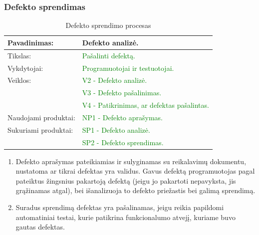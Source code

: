 \documentclass{VUMIFPSkursinis}
\begin{document}
	\subsubsection{Defekto sprendimas}
	\begin{center}
		\begin{table}[ht]
			\caption{Defekto sprendimo procesas}
			\begin{tabular}{ | l | l | }
				\hline
				Pavadinimas:         & Defekto analizė.				\\ \hline
				Tikslas:             & \textcolor{green}{Pašalinti defektą.}				\\ \hline
				Vykdytojai:          & \textcolor{green}{ Programuotojai ir testuotojai.	}	\\ \hline
				Veiklos:             & \textcolor{green}{V2 - Defekto analizė.}				\\
				                     & \textcolor{green}{V3 - Defekto pašalinimas.}			\\
				                     & \textcolor{green}{V4 - Patikrinimas, ar defektas pašalintas.}	\\ \hline
				Naudojami produktai: & \textcolor{green}{NP1 - Defekto aprašymas.}			\\ \hline
				Sukuriami produktai: & \textcolor{green}{SP1 - Defekto analizė.	}		\\
				                     & \textcolor{green}{SP2 - Defekto sprendimas.}			\\ \hline
			\end{tabular}
		\end{table}
	\end{center}
	\begin{enumerate}
		\item{
			Defekto aprašymas pateikiamias ir sulyginamas su reikalavimų dokumentu, nustatoma ar tikrai defektas yra validus.
			Gavus defektą programuotojas pagal pateiktus žingsnius pakartoją defektą (jeigu jo pakartoti nepavyksta, jis grąžinamas atgal), bei išanalizuoja to defekto priežastis bei galimą sprendimą.}
		\item{
			Suradus sprendimą defektas yra pašalinamas, jeigu reikia papildomi automatiniai testai, kurie patikrina funkcionalumo atvejį, kuriame buvo gautas defektas.
		}
	\end{enumerate}
\end{document}
